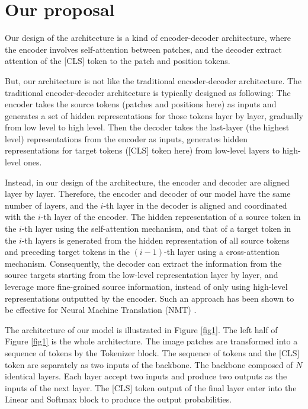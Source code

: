 \documentclass[anon,12pt]{colt2024} %
\begin{document}
\section{Our proposal}
Our design of the architecture is a kind of encoder-decoder architecture, where the encoder involves self-attention between patches, and the decoder extract attention of the [CLS] token to the patch and position tokens.

But, our architecture is not like the traditional encoder-decoder architecture.
The traditional encoder-decoder architecture is typically designed as following:
The encoder takes the source tokens (patches and positions here) as inputs and generates a set of hidden representations for those tokens layer by layer, gradually from low level to high level. Then the decoder takes the last-layer (the highest level) representations from the encoder as inputs, generates hidden representations for target tokens ([CLS] token here) from low-level layers to high-level ones.


Instead, in our design of the architecture, the encoder and decoder are aligned layer by layer.
Therefore, the encoder and decoder of our model have the same number of layers, and the $i$-th layer in the decoder is aligned and coordinated with the $i$-th layer of the encoder.
The hidden representation of a source token in the $i$-th layer using the self-attention mechanism, and that of a target token in the $i$-th layers is generated from the hidden representation of all source tokens and preceding target tokens in the $(i-1)$-th layer using a cross-attention mechanism.
Consequently, the decoder can extract the information from the source targets starting from the low-level representation layer by layer, and leverage more fine-grained source information, instead of only using high-level representations outputted by the encoder. Such an approach has been shown to be effective for Neural Machine Translation (NMT) \cite{he2018layer}.

The architecture of our model is illustrated in Figure \ref{fig1}.
The left half of Figure \ref{fig1} is the whole architecture. The image patches are transformed into a sequence of tokens by the Tokenizer block. The sequence of tokens and the [CLS] token are separately as two inputs of the backbone. The backbone composed of $N$ identical layers. Each layer accept two inputs and produce two outputs as the inputs of the next layer. The [CLS] token output of the final layer enter into the Linear and Softmax block to produce the output probabilities.
\end{document}
